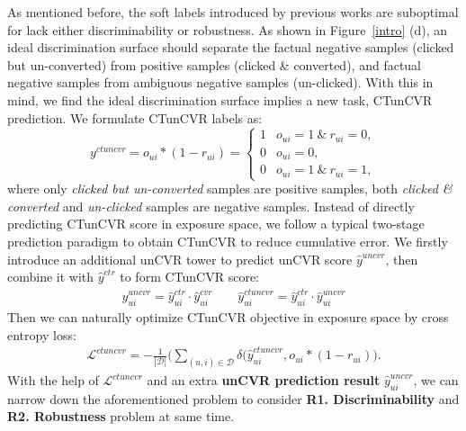 As mentioned before, the soft labels introduced by previous works are suboptimal for lack either discriminability or robustness. As shown in Figure~\ref{intro} (d), an ideal discrimination surface should separate the factual negative samples (clicked but un-converted) from positive samples (clicked \& converted), and factual negative samples from ambiguous negative samples (un-clicked). With this in mind, we find the ideal discrimination surface implies a new task, CTunCVR prediction. We formulate CTunCVR labels as:
\begin{equation}
y^{ctuncvr} = o_{ui} * (1-r_{ui}) = 
\begin{cases} 
1 & o_{ui}=1~\&~r_{ui} = 0, \\
0 &  o_{ui}=0, \\
0 & o_{ui}=1~\&~r_{ui} = 1,
\end{cases}
\end{equation}
where only \textit{clicked but un-converted} samples are positive samples, both \textit{clicked \& converted} and \textit{un-clicked} samples are negative samples. Instead of directly predicting CTunCVR score in exposure space, we follow a typical two-stage prediction paradigm to obtain CTunCVR to 
reduce cumulative error. We firstly introduce an additional unCVR tower to predict unCVR score $\hat{y}^{uncvr}$, then combine it with $\hat{y}^{ctr}$ to form CTunCVR score:
% 
\begin{equation}
\begin{split}
\hat{y}^{uncvr}_{ui} = \hat{y}^{ctr}_{ui}\cdot\hat{y}^{cvr}_{ui}\quad \quad
\hat{y}^{ctuncvr}_{ui} =\hat{y}^{ctr}_{ui}\cdot\hat{y}^{uncvr}_{ui}
\end{split}
\label{uncvr}
\end{equation}
Then we can naturally optimize CTunCVR objective in exposure space by cross entropy loss: 
\begin{equation}
\begin{split}
\mathcal{L}^{ctuncvr} = - \frac{1}{|\mathcal{D}|}\Big(\sum_{(u,i)\in\mathcal{D}}\delta(\hat{y}^{ctuncvr}_{ui}, o_{ui} * (1-r_{ui})\Big).
\end{split}
\label{uncvr}
\end{equation}
With the help of $\mathcal{L}^{ctuncvr}$ and an extra \textbf{unCVR prediction result} $\hat{y}^{uncvr}_{ui}$, we can narrow down the aforementioned problem to consider \textbf{R1. Discriminability} and \textbf{R2. Robustness} problem at same time.
